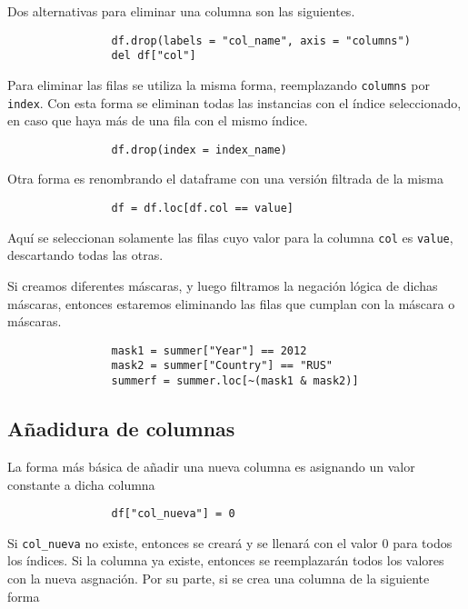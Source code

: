             Dos alternativas para eliminar una columna son las siguientes.

            \begin{verbatim}
                df.drop(labels = "col_name", axis = "columns")
                del df["col"]
            \end{verbatim}

            Para eliminar las filas se utiliza la misma forma, reemplazando \texttt{columns} por \texttt{index}. Con esta forma se eliminan todas las instancias con el índice seleccionado, en caso que haya más de una fila con el mismo índice.

            \begin{verbatim}
                df.drop(index = index_name)
            \end{verbatim}

            Otra forma es renombrando el dataframe con una versión filtrada de la misma

            \begin{verbatim}
                df = df.loc[df.col == value]
            \end{verbatim}

            Aquí se seleccionan solamente las filas cuyo valor para la columna \texttt{col} es \texttt{value}, descartando todas las otras.

            Si creamos diferentes máscaras, y luego filtramos la negación lógica de dichas máscaras, entonces estaremos eliminando las filas que cumplan con la máscara o máscaras.

            \begin{verbatim}
                mask1 = summer["Year"] == 2012
                mask2 = summer["Country"] == "RUS"
                summerf = summer.loc[~(mask1 & mask2)]
            \end{verbatim}


        \subsection{Añadidura de columnas}

            La forma más básica de añadir una nueva columna es asignando un valor constante a dicha columna

            \begin{verbatim}
                df["col_nueva"] = 0
            \end{verbatim}

            Si \texttt{col\_nueva} no existe, entonces se creará y se llenará con el valor 0 para todos los índices. Si la columna ya existe, entonces se reemplazarán todos los valores con la nueva asgnación. Por su parte, si se crea una columna de la siguiente forma

